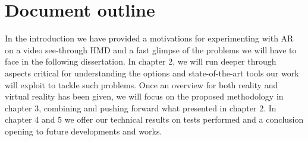 \section{Document outline}
In the introduction we have provided a motivations for experimenting with AR on a video see-through HMD and a fast glimpse of the problems we will have to face in the following dissertation. In chapter 2, we will run deeper through aspects critical for understanding the options and state-of-the-art tools our work will exploit to tackle such problems. Once an overview for both reality and virtual reality has been given, we will focus on the proposed methodology in chapter 3, combining and pushing forward what presented in chapter 2. In chapter 4 and 5 we offer our technical results on tests performed and a conclusion opening to future developments and works.